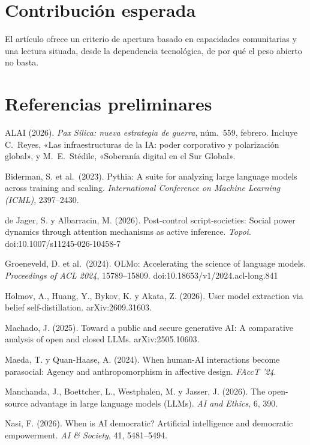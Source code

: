 \documentclass[11pt]{article}
\begin{document}
\section*{Contribución esperada}

El artículo ofrece un criterio de apertura basado en capacidades comunitarias y una lectura situada, desde la dependencia tecnológica, de por qué el peso abierto no basta.

\section*{Referencias preliminares}

\begingroup
\setlength{\parindent}{-1.5em}
\setlength{\leftskip}{1.5em}
\setlength{\parskip}{0.4em}
\raggedright

ALAI (2026). \textit{Pax Silica: nueva estrategia de guerra}, núm.\ 559, febrero. Incluye C.~Reyes, «Las infraestructuras de la IA: poder corporativo y polarización global», y M.~E.~Stédile, «Soberanía digital en el Sur Global».

Biderman, S. et al.\ (2023). Pythia: A suite for analyzing large language models across training and scaling. \textit{International Conference on Machine Learning (ICML)}, 2397--2430.

de Jager, S. y Albarracin, M. (2026). Post-control script-societies: Social power dynamics through attention mechanisms as active inference. \textit{Topoi}. doi:10.1007/s11245-026-10458-7

Groeneveld, D. et al.\ (2024). OLMo: Accelerating the science of language models. \textit{Proceedings of ACL 2024}, 15789--15809. doi:10.18653/v1/2024.acl-long.841

Holmov, A., Huang, Y., Bykov, K. y Akata, Z. (2026). User model extraction via belief self-distillation. arXiv:2609.31603.

Machado, J. (2025). Toward a public and secure generative AI: A comparative analysis of open and closed LLMs. arXiv:2505.10603.

Maeda, T. y Quan-Haase, A. (2024). When human-AI interactions become parasocial: Agency and anthropomorphism in affective design. \textit{FAccT '24}.

Manchanda, J., Boettcher, L., Westphalen, M. y Jasser, J. (2026). The open-source advantage in large language models (LLMs). \textit{AI and Ethics}, 6, 390.

Nasi, F. (2026). When is AI democratic? Artificial intelligence and democratic empowerment. \textit{AI \& Society}, 41, 5481--5494.
\end{document}
